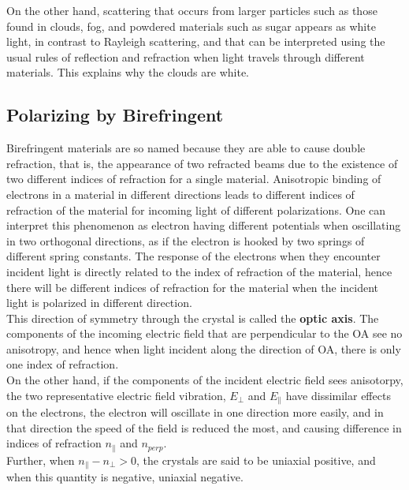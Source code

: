 \documentclass[11pt]{book}
\theoremstyle{break}
\theoremstyle{break}
\begin{document}
On the other hand, scattering that occurs from larger particles such as those found in clouds, fog, and powdered materials such as sugar appears as white light, in contrast to Rayleigh scattering, and that can be interpreted using the usual rules of reflection and refraction when light travels through different materials. This explains why the clouds are white. \\

\subsection{Polarizing by Birefringent}
Birefringent materials are so named because they are able to cause double refraction, that is, the appearance of two refracted beams due to the existence of
two different indices of refraction for a single material. Anisotropic binding of electrons in a material in different directions leads to different indices of refraction of the material for incoming light of different polarizations. One can interpret this phenomenon as electron having different potentials when oscillating in two orthogonal directions, as if the electron is hooked by two springs of different spring constants. The response of the electrons when they encounter incident light is directly related to the index of refraction of the material, hence there will be different indices of refraction for the material when the incident light is polarized in different direction.\\

This direction of symmetry through the crystal is called the \textbf{optic axis}. The components of the incoming electric field that are perpendicular to the OA see no anisotropy, and hence when light incident along the direction of OA, there is only one index of refraction.\\

On the other hand, if the components of the incident electric field sees anisotorpy, the two representative electric field vibration, $E_{\perp}$ and $E_\parallel$ have dissimilar effects on the electrons, the electron will oscillate in one direction more easily, and in that direction the speed of the field is reduced the most, and causing difference in indices of refraction $n_{\parallel}$ and $n_{perp}$.\\

Further, when $n_{\parallel} - n_{\perp}>0$, the crystals are said to be uniaxial positive, and when this quantity is negative, uniaxial negative.
\end{document}
